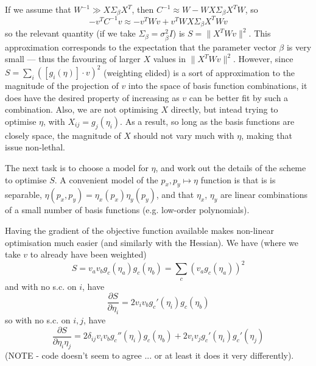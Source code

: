 If we assume that $W^{-1} \gg X \Sigma_\beta X^T$, then
$C^{-1} \approx W - W X \Sigma_\beta X^T W$, so
\[
- v^T C^{-1} v \approx  - v^T W v + v^T W X \Sigma_\beta X^T W v
\]
so the relevant quantity (if we take $\Sigma_\beta = \sigma_\beta^2
I$) is $S = \|X^T W v\|^2$. This approximation corresponds to the
expectation that the parameter vector $\beta$ is very small --- thus
the favouring of larger $X$ values in $\| X^T W v\|^2$. However, since
$S = \sum_i ([g_i(\eta)] \cdot v)^2$ (weighting elided) is a sort of
approximation to the magnitude of the projection of $v$ into the space of basis
function combinations, it does have the desired property of increasing
as $v$ can be better fit by such a combination. Also, we are
not optimising $X$ directly, but intead trying to optimise
$\eta$, with $X_{ij} = g_j (\eta_i)$. As a result, so long as the basis
functions are closely space, the magnitude of $X$ should not vary much
with $\eta$, making that issue non-lethal.

The next task is to choose a model for $\eta$, and work out the details
of the scheme to optimise $S$. A convenient model of the $p_x, p_y
\mapsto \eta$ function is that is is separable, $\eta(p_x, p_y) = \eta_x
(p_x) \eta_y (p_y)$, and that $\eta_x$, $\eta_y$ are linear combinations
of a small number of basis functions (e.g. low-order polynomials).

Having the gradient of the objective function available makes non-linear
optimisation much easier (and similarly with the Hessian). We have (where
we take $v$ to already have been weighted)
\[
S = v_a v_b g_c (\eta_a) g_c (\eta_b) = \sum_c (v_a g_c (\eta_a))^2
\]
and with no s.c. on $i$, have
\[
\frac{\partial S}{\partial \eta_i} = 2 v_i v_b g_c' (\eta_i) g_c (\eta_b)
\]
so with no s.c. on $i, j$, have
\[
\frac{\partial S}{\partial \eta_i \eta_j} = 2 \delta_{ij} v_i v_b g_c''(\eta_i) g_c (\eta_b)
+ 2 v_i v_j g_c'(\eta_i) g_c'(\eta_j)
\]
(NOTE - code doesn't seem to agree ... or at least it does it very differently).
